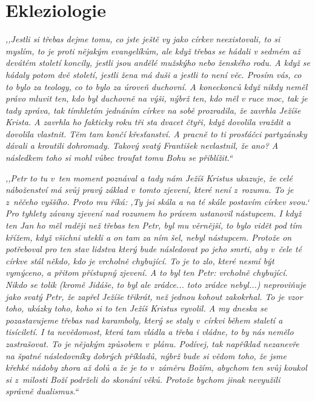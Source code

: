 \section{Ekleziologie}

\textit{%
,,Jestli si třebas dejme tomu, co jste ještě vy jako církev neexistovali, to si
myslím, to je proti nějakým evangelíkům, ale když třebas se hádali v sedmém až
devátém století koncily, jestli jsou andělé mužskýho nebo ženského rodu. A když
se hádaly potom dvě století, jestli žena má duši a jestli to není věc. Prosím
vás, co to bylo za teology, co to bylo za úroveň duchovní. A koneckonců když
nikdy neměl právo mluvit ten, kdo byl duchovně na výši, nýbrž ten, kdo měl v
ruce moc, tak je tady zpráva, tak tímhletím jednáním církev na sobě prozradila,
že zavrhla Ježíše Krista. A zavrhla ho fakticky roku tři sta dvacet čtyři, když
dovolila vraždit a dovolila vlastnit. Těm tam končí křesťanství. A pracně to ti
prosťáčci partyzánsky dávali a kroutili dohromady. Takový svatý František
nevlastnil, že ano? A následkem toho si mohl vůbec troufat tomu Bohu se
přiblížit.``
}

\textit{%
,,Petr to tu v~ten moment poznával a tady nám Ježíš Kristus ukazuje, že celé
náboženství má svůj pravý základ v~tomto zjevení, které není z~rozumu. To je
z~něčeho vyššího. Proto mu říká: ,Ty jsi skála a na té skále postavím církev
svou.` Pro tyhlety závany zjevení nad rozumem ho právem ustanovil nástupcem. I
když ten Jan ho měl raději než třebas ten Petr, byl mu věrnější, to bylo vidět
pod tím křížem, když všichni utekli a on tam za ním šel, nebyl nástupcem.
Protože on potřeboval pro ten stav lidstva který bude následovat po jeho smrti,
aby v~čele té církve stál někdo, kdo je vrcholně chybující. To je to zlo, které
nesmí být vymýceno, a přitom přístupný zjevení. A to byl ten Petr: vrcholně
chybující. Nikdo se tolik (kromě Jidáše, to byl ale zrádce... toto zrádce
nebyl...) neproviňuje jako svatý Petr, že zapřel Ježíše třikrát, než jednou
kohout zakokrhal. To je vzor toho, ukázky toho, koho si to ten Ježíš Kristus
vyvolil. A my dneska se pozastavujeme třebas nad karamboly, který se staly
v~církvi během staletí a tisíciletí. I ta nevědomost, která tam vládla a třeba i
vládne, to by nás nemělo zastrašovat. To je nějakým způsobem v~plánu. Podívej,
tak například nezanevře na špatné následovníky dobrých příkladů, nýbrž bude si
vědom toho, že jsme křehké nádoby zhora až dolů a že je to v~záměru Božím,
abychom ten svůj koukol si z~milosti Boží podrželi do skonání věků. Protože
bychom jinak nevyužili správně dualismus.``
}

